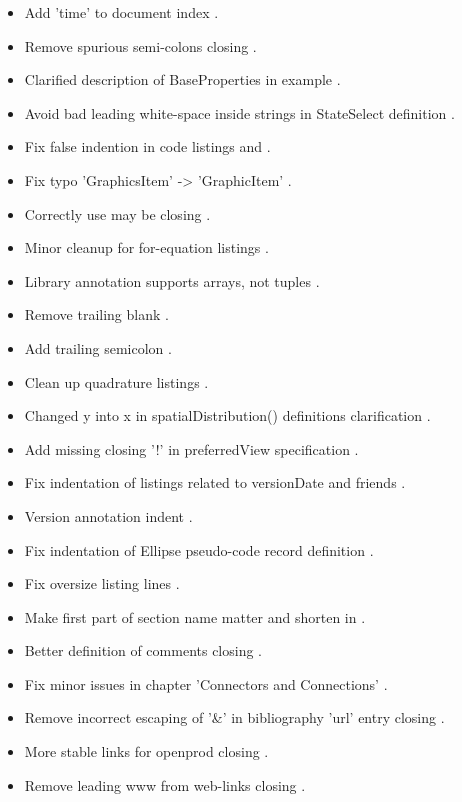 \begin{itemize}
\begin{itemize}
\item Add 'time' to document index .
\item Remove spurious semi-colons  closing .
\item Clarified description of BaseProperties in example .
\item Avoid bad leading white-space inside strings in StateSelect definition .
\item Fix false indention in code listings  and .
\item Fix typo 'GraphicsItem' -> 'GraphicItem' .
\item Correctly use may be  closing .
\item Minor cleanup for for-equation listings .
\item Library annotation supports arrays, not tuples .
\item Remove trailing blank .
\item Add trailing semicolon .
\item Clean up quadrature listings .
\item Changed y into x in spatialDistribution() definitions  clarification .
\item Add missing closing '!' in preferredView specification .
\item Fix indentation of listings related to versionDate and friends .
\item Version annotation indent .
\item Fix indentation of Ellipse pseudo-code record definition .
\item Fix oversize listing lines .
\item Make first part of section name matter  and shorten in .
\item Better definition of comments  closing .
\item Fix minor issues in chapter 'Connectors and Connections' .
\item Remove incorrect escaping of '\&' in bibliography 'url' entry  closing .
\item More stable links for openprod  closing .
\item Remove leading www from web-links  closing .

\end{itemize}
\end{itemize}
